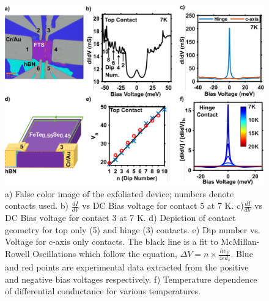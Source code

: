 \par
\begin{figure}
    \centering
    \includegraphics[width=\textwidth]{Chap3/Figures/Figure2.pdf}
    \caption{a) False color image of the exfoliated device; numbers denote contacts used. b) $\frac{dI}{dV}$ vs DC Bias voltage for contact 5 at 7 K. c)$\frac{dI}{dV}$ vs DC Bias voltage for contact 3 at 7 K. d) Depiction of contact geometry for top only (5) and hinge (3) contacts. e) Dip number vs. Voltage for c-axis only contacts. The black line is a fit to McMillan-Rowell Oscillations which follow the equation, $\Delta V = n\times\frac{hv_{F}}{4ed_{s}}$. Blue and red points are experimental data extracted from the positive and negative bias voltages respectively. f) Temperature dependence of differential conductance for various temperatures.}
    \label{MainResults}
\end{figure}
